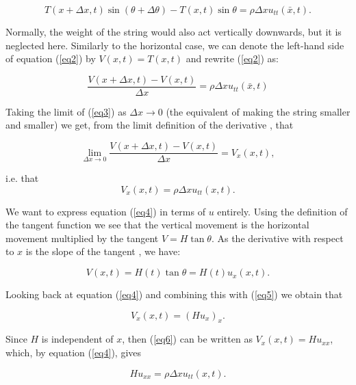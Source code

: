 \documentclass[a4paper, 12pt]{article}
\numberwithin{equation}{section}
\begin{document}
 \begin{equation} \label{eq2}
    T(x+\Delta x,t)\sin{(\theta + \Delta \theta)}-T(x,t)\sin{\theta}=\rho\Delta x u_{tt} (\bar{x},t).
 \end{equation}

 Normally, the weight of the string would also act vertically downwards, but it is neglected here. Similarly to the 
 horizontal case, we can denote the left-hand side of equation (\ref{eq2}) by $V(x,t)=T(x,t)$ and rewrite (\ref{eq2})
 as:

 \begin{equation} \label{eq3}
    \frac{V(x+\Delta x,t)-V(x,t)}{\Delta x}=\rho\Delta x u_{tt} (\bar{x},t)
 \end{equation}

 Taking the limit of (\ref{eq3}) as $\Delta x \rightarrow 0$ (the equivalent of making the string smaller and smaller)
 we get, from the limit definition of the derivative \cite{Spi}, that 

 \begin{equation*}
    \lim_{\Delta x \rightarrow 0}\frac{V(x+\Delta x,t)-V(x,t)}{\Delta x}=V_x(x,t),
 \end{equation*}

i.e. that 
\begin {equation} \label{eq4}
    V_x(x,t)=\rho\Delta x u_{tt} (x,t).
\end{equation}

We want to express equation (\ref{eq4}) in terms of $u$ entirely. Using the definition of the tangent function we see that the vertical movement is the
horizontal movement multiplied by the tangent $V=H\tan{\theta}$. As the derivative with respect to $x$ is the slope of
the tangent \cite{Spi}, we have:

\begin{equation} \label{eq5}
    V(x,t)=H(t)\tan{\theta}=H(t)u_x(x,t).
\end{equation}

Looking back at equation (\ref{eq4}) and combining this with (\ref{eq5}) we obtain that

\begin{equation} \label{eq6}
    V_x(x,t)=(Hu_x)_x.
\end{equation}

Since $H$ is independent of $x$, then (\ref{eq6}) can be written as $V_x(x,t)=Hu_{xx}$, which, by equation (\ref{eq4}), 
gives

\begin {equation} \label{eq7}
    Hu_{xx}=\rho\Delta x u_{tt} (x,t).
\end{equation}
\end{document}
